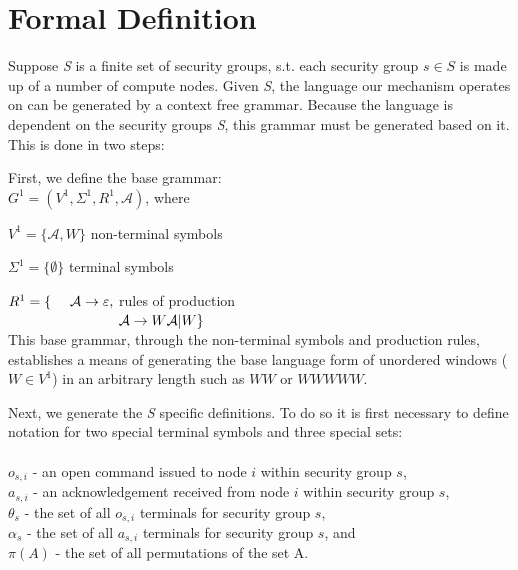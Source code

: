 \documentclass{llncs}
\newcommand{\tab}{\hspace*{2em}}
\begin{document}
\section{Formal Definition}

Suppose \emph{S} is a finite set of security groups, s.t. each security group $s\in S$ is made up of a number of compute nodes. Given \emph{S}, the language our mechanism operates on can be generated by a context free grammar. Because the language is dependent on the security groups \emph{S}, this grammar must be generated based on it. This is done in two steps:

First, we define the base grammar:\\

\tab $G^1 = (V^1, \Sigma^1, R^1, \mathcal{A})$, where

\tab $V^1 = \{\mathcal{A} , W\}$ \hfill non-terminal symbols \hspace*{6em}

\tab $\Sigma ^1 = \{ \emptyset\}$ \hfill terminal symbols\hspace*{6.3em}

\tab $R^1 = \lbrace \hspace*{1.35em}\mathcal{A} \rightarrow \varepsilon ,$ \hfill rules of production \hspace*{6em} \\
$\tab \hspace*{5.9em} \mathcal{A}\rightarrow W\mathcal{A} |W\rbrace$\\

This base grammar, through the non-terminal symbols and production rules, establishes a means of generating the base language form of unordered windows ($W\in V^1$) in an arbitrary length such as $WW$ or $WWWWW$.

Next, we generate the \emph{S} specific definitions. To do so it is first necessary to define notation for two special terminal symbols and three special sets:\\
\\
$o_{s,i}$ - an open command issued to node $i$ within security group $s$,\\
$a_{s,i}$ - an acknowledgement received from node $i$ within security group $s$,\\
$\theta_s$ - the set of all $o_{s,i}$ terminals for security group $s$, \\
$\alpha_s$ - the set of all $a_{s,i}$ terminals for security group $s$, and \\
$\pi(A)$ - the set of all permutations of the set A.\\
\end{document}
